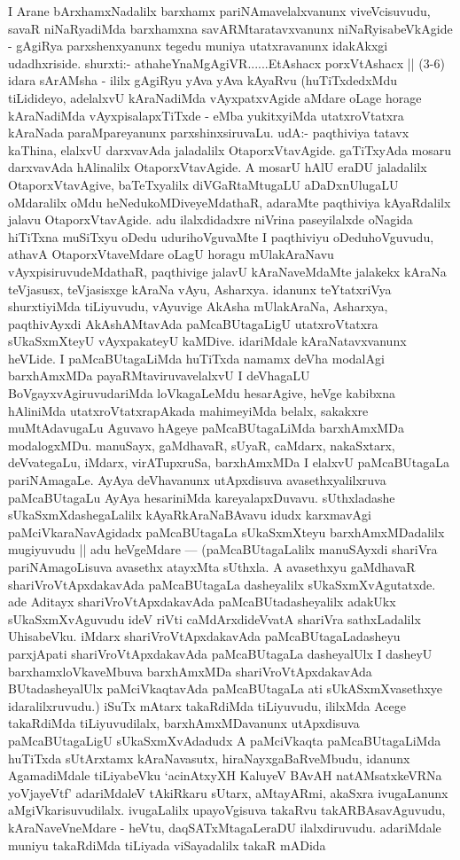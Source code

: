 \begin{artha}
I Arane bArxhamxNadalilx barxhamx pariNAmavelalxvanunx viveVcisuvudu, savaR niNaRya\-diMda barxhamxna savARMtaratavxvanunx niNaRyisabeVkAgide - gAgiRya parxshenxyanunx tegedu muniya utatxravanunx idakAkxgi udadhxriside. shurxti:- athaheYnaMgAgiVR......\-EtAshacx porxVtAshacx || (3-6) idara sArAMsha - ililx gAgiRyu yAva yAva \-kAyaRvu (huTiTxdedxMdu tiLidideyo, adelalxvU kAraNadiMda vAyxpatxvAgide \-aMdare oLage horage kAraNadiMda vAyxpisalapxTiTxde - eMba yukitxyiMda utatxroVtatxra kAraNada paraMpareyanunx parxshinxsiruvaLu. udA:- paqthiviya tatavx kaThina, elalxvU darxvavAda jaladalilx OtaporxVtavAgide. gaTiTxyAda mosaru darxvavAda hAlinalilx OtaporxVtavAgide. A mosarU hAlU eraDU jaladalilx OtaporxVtavAgive, baTeTx\-yalilx diVGaRtaMtugaLU aDaDxnUlugaLU oMdaralilx oMdu heNedukoMDive\break yeMdathaR, adaraMte paqthiviya kAyaRdalilx jalavu OtaporxVtavAgide. adu ilalxdidadxre niVrina paseyilalxde oNagida hiTiTxna muSiTxyu oDedu udurihoVgu\-vaMte I paqthiviyu oDeduhoVguvudu, athavA OtaporxVtaveMdare oLagU \-horagu mUlakAraNavu vAyxpisiruvudeMdathaR, paqthivige jalavU kAraNa\-veMdaMte jalakekx kAraNa teVjasusx, teVjasisxge kAraNa vAyu, Asharxya. idanunx teYtatxriVya \-shurxtiyiMda tiLiyuvudu, vAyuvige AkAsha mUlakAraNa, Asharxya, paqthivAyxdi AkAshAMtavAda paMcaBUtagaLigU utatxroVtatxra sUkaSxmXteyU vAyxpakateyU \-kaMDive. idariMdale kAraNatavxvanunx heVLide. I paMcaBUtagaLiMda huTiTxda \-namamx deVha modalAgi barxhAmxMDa payaRMtaviruvavelalxvU I deVhagaLU BoVgayxvAgi\-ruvudariMda loVkagaLeMdu hesarAgive, heVge kabibxna hAliniMda utatxroVtatxra\-pAkada mahimeyiMda belalx, sakakxre muMtAdavugaLu Aguvavo hAgeye paMcaBUta\-gaLiMda barxhAmxMDa modalogxMDu. manuSayx, gaMdhavaR, sUyaR, caMdarx, nakaSxtarx, deVvate\-gaLu, iMdarx, virATupxruSa, barxhAmxMDa I elalxvU paMcaBUtagaLa pariNAmagaLe. AyAya deVhavanunx utApxdisuva avasethxyalilxruva paMcaBUtagaLu AyAya hesariniMda kareyalapxDuvavu. sUthxladashe sUkaSxmXdashegaLalilx kAyaRkAraNaBAvavu idudx karxmavAgi paMciVkaraNavAgidadx paMcaBUtagaLa sUkaSxmXteyu barxhAmxMDadalilx mugiyuvudu || adu heVgeMdare --- (paMcaBUtagaLalilx manuSAyxdi shariVra pariNAmagoLisuva avasethx atayxMta sUthxla. A avasethxyu gaMdhavaR shariVroVtApxda\-kavAda paMcaBUtagaLa dasheyalilx sUkaSxmXvAgutatxde. ade Aditayx shariVroVtApxdaka\-vAda paMcaBUtadasheyalilx adakUkx sUkaSxmXvAguvudu ideV riVti caMdArxdi\-deVvatA shariVra sathxLadalilx UhisabeVku. iMdarx shariVroVtApxdakavAda paMcaBUtagaLadasheyu parxjApati shariVroVtApxdakavAda paMcaBUtagaLa dasheyalUlx I dasheyU barxhamxloVka\-veMbuva barxhAmxMDa shariVroVtApxdakavAda BUtadasheyalUlx paMciVkaqtavAda paMca\-BUtagaLa ati sUkASxmXvasethxye idaralilxruvudu.) iSuTx mAtarx takaRdiMda tiLiyu\-vudu, ililxMda Acege takaRdiMda tiLiyuvudilalx, barxhAmxMDavanunx utApxdisuva paMca\-BUtagaLigU sUkaSxmXvAdadudx A paMciVkaqta paMcaBUtagaLiMda huTiTxda sUtArxtamx kAraNavasutx, hiraNayxgaBaRveMbudu, idanunx AgamadiMdale tiLiyabeVku \-`acinAtxyXH KaluyeV BAvAH natAMsatxkeVRNa yoVjayeVtf' adariMdaleV tAkiRkaru \-sUtarx, aMtayARmi, akaSxra ivugaLanunx aMgiVkarisuvudilalx. ivugaLalilx upayoVgisuva takaRvu takARBAsavAguvudu, kAraNaveVneMdare - heVtu, daqSATxMtagaLeraDU ilalx\-diruvudu. adariMdale muniyu takaRdiMda tiLiyada viSayadalilx takaR mADida 
\end{artha}
